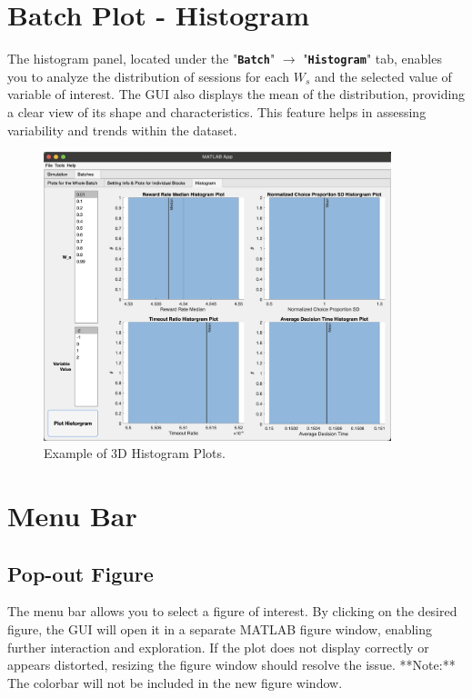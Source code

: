 \section{Batch Plot - Histogram}

The histogram panel, located under the "\textbf{\texttt{Batch}}" $\rightarrow$ "\textbf{\texttt{Histogram}}" tab, enables you to analyze the distribution of sessions for each \(W_s\) and the selected value of variable of interest. The GUI also displays the mean of the distribution, providing a clear view of its shape and characteristics. This feature helps in assessing variability and trends within the dataset.

\begin{figure}[H]
    \centering
    \includegraphics[width=0.9\textwidth]{figs/3D_histogram.png}
    \caption{Example of 3D Histogram Plots.}
    \label{fig:3D_histogram}
\end{figure}

\section{Menu Bar}

\subsection{Pop-out Figure}

The menu bar allows you to select a figure of interest. By clicking on the desired figure, the GUI will open it in a separate MATLAB figure window, enabling further interaction and exploration.  
If the plot does not display correctly or appears distorted, resizing the figure window should resolve the issue.  
**Note:** The colorbar will not be included in the new figure window. 


